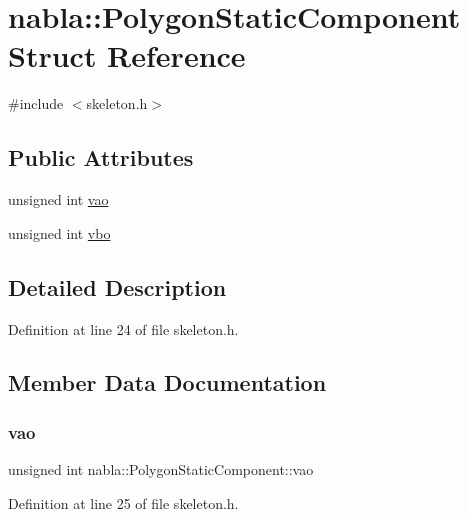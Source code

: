 \hypertarget{structnabla_1_1_polygon_static_component}{}\section{nabla\+::Polygon\+Static\+Component Struct Reference}
\label{structnabla_1_1_polygon_static_component}


{\ttfamily \#include $<$skeleton.\+h$>$}

\subsection*{Public Attributes}
\begin{DoxyCompactItemize}
\item 
unsigned int \mbox{\hyperlink{structnabla_1_1_polygon_static_component_abdd8665db30223347a7f0f223313693f}{vao}}
\item 
unsigned int \mbox{\hyperlink{structnabla_1_1_polygon_static_component_a5fa40c6f59d8b96daa4f575385ce05c7}{vbo}}
\end{DoxyCompactItemize}


\subsection{Detailed Description}


Definition at line 24 of file skeleton.\+h.



\subsection{Member Data Documentation}
\mbox{\label{structnabla_1_1_polygon_static_component_abdd8665db30223347a7f0f223313693f}} 
\subsubsection{\texorpdfstring{vao}{vao}}
{\footnotesize\ttfamily unsigned int nabla\+::\+Polygon\+Static\+Component\+::vao}



Definition at line 25 of file skeleton.\+h.

\mbox{\label{structnabla_1_1_polygon_static_component_a5fa40c6f59d8b96daa4f575385ce05c7}} 

